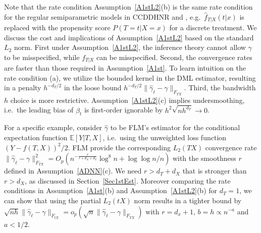 \documentclass[lettersize, 12pt]{article}
\begin{document}
Note that the rate condition Assumption~\ref{A1stL2}(b) 
 is the same rate condition
for the regular semiparametric models in CCDDHNR and \cite{CNS21ADML}, e.g.\ $\hat f_{T|X}(t|x)$ is replaced with the propensity score $P(T=t|X=x)$ for a discrete treatment.
We discuss the cost and implications of Assumption~\ref{A1stL2} based on the standard $L_2$ norm.  
First under Assumption~\ref{A1stL2}, the inference theory cannot allow $\gamma$ to be misspecified, while $f_{T|X}$ can be misspecified. 
Second, the convergence rates are faster than those required in Assumption~\ref{A1st}.
To learn intuition on the rate condition (a), we utilize the bounded kernel in the DML estimator, resulting in a penalty $h^{-d_T/2}$ in the loose bound $h^{-d_T/2} \|\hat \gamma_\ell - \gamma\|_{F_{TX}}$.
Third, the bandwidth $h$ choice is more restrictive. 
Assumption~\ref{A1stL2}(c) implies undersmoothing, i.e.\ the leading bias of $\hat\beta_t$ is first-order ignorable by $h^2\sqrt{nh^{d_T}}  \rightarrow 0$.

For a specific example, consider $\hat\gamma$ to be FLM's estimator for the conditional expectation function $\mathbb{E}[Y|T,X]$,
i.e.\ using the unweighted loss function $(Y-f(T,X))^2/2$.
FLM provide the corresponding $L_2(TX)$ convergence rate $\|\hat \gamma_\ell -\gamma\|_{F_{TX}}^2 = O_p\left(
n^{-\frac{r}{r+d_X+d_T}}\log^8n  +\log\log n/n\right)$ with the smoothness $r$ defined in Assumption~\ref{ADNN}(c).
We need  $r > d_T + d_X$ that is stronger than $r > d_X$, as discussed in Section~\ref{Sec1stEst}.
Moreover comparing the rate conditions in Assumption~\ref{A1st}(b) and Assumption~\ref{A1stL2}(b) for $d_T=1$, we can show that using the partial $L_2(tX)$ norm results in a tighter bound by $\sqrt{nh}\|\hat\gamma_\ell - \gamma\|_{F_{tX}} = o_p(\sqrt{n}\|\hat\gamma_\ell - \gamma\|_{F_{TX}})$ with $r = d_x + 1$, $b=h \propto n^{-a}$ and $a < 1/2$.
\end{document}
